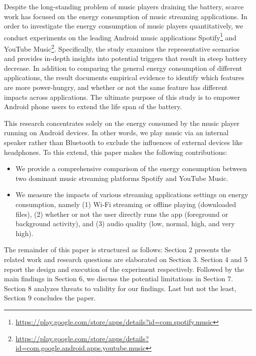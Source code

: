 Despite the long-standing problem of music players draining the battery, scarce work has focused on the energy consumption of music streaming applications. In order to investigate the energy consumption of music players quantitatively, we conduct experiments on the leading Android music applications Spotify\footnote{\label{note1}\href{ https://play.google.com/store/apps/details?id=com.spotify.music}{https://play.google.com/store/apps/details?id=com.spotify.music}} and YouTube Music\footnote{\label{note1}\href{ https://play.google.com/store/apps/details?id=com.google.android.apps.youtube.music}{https://play.google.com/store/apps/details?id=com.google.android.apps.youtube.music}}. Specifically, the study examines the representative scenarios and provides in-depth insights into potential triggers that result in steep battery decrease. In addition to comparing the general energy consumption of different applications, the result documents empirical evidence to identify which features are more power-hungry, and whether or not the same feature has different impacts across applications. The ultimate purpose of this study is to empower {\color{blue}Android phone }users to extend the life span of the battery. 

This research concentrates solely on the {\color{blue}energy} consumed by the music player running on Android devices. In other words, we play music via an internal speaker rather than Bluetooth to exclude the influences of external devices like headphones. To this extend, this paper makes the following contributions: 
\begin{itemize}
\item We provide a comprehensive comparison of the energy consumption between two dominant music streaming platforms Spotify and YouTube Music. 
\item We {\color{blue}measure} the impacts of various {\color{blue}streaming applications} settings on energy consumption, namely (1) Wi-Fi streaming or offline playing (\ie downloaded files), (2) whether or not the user directly runs the app (\ie foreground or background activity), and (3) audio quality (\ie low, normal, high, and very high). 
\end{itemize}

The remainder of this paper is structured as follows: Section 2 presents the related work and research questions are elaborated on Section 3. Section 4 and 5 report the design and execution of the experiment respectively. Followed by the main findings in Section 6, we discuss the potential limitations in Section 7. Section 8 analyzes threats to validity for our findings. Last but not the least, Section 9 concludes the paper. 

